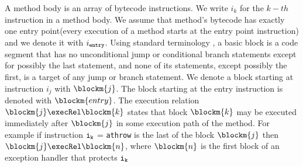  A method body is an array of bytecode instructions. We write $i_k$ for the $k-th$ instruction in a method body.
 We assume that method's bytecode has exactly one entry point(every execution of a method starts at the entry point instruction) and we denote it with $i_{\tt{entry}}$. Using standard terminology \cite{ARUCom1986}, a
basic block is a code segment that has no unconditional jump or
conditional branch statements except for possibly the last
statement, and none of its statements, except possibly the first,
is a target of any jump or branch statement. 
 We denote a block starting at instruction  $i_{j}$ with $\blockm{j}$. The block starting at the entry instruction is denoted with $\blockm{entry}$.
 The execution relation  $\blockm{j} \execRel \blockm{k}$  states that block $\blockm{k}$ may be executed immediately after $\blockm{j}$ in some execution path of the method. For example if  instruction $\tt{i_{k}}$ = \texttt{athrow} is the last of the block $\blockm{j}$ then 
$\blockm{j} \execRel \blockm{n}$, where  $\blockm{n}$ is the first block of an exception handler that protects $\tt{i_{k}}$ 

